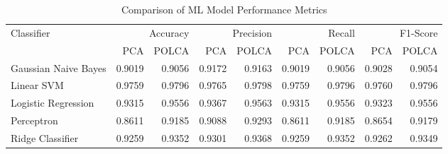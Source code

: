 \begin{table}[htbp]
\caption{Comparison of ML Model Performance Metrics}
\label{tab:model_comparison}
\begin{tabular}{lrrrrrrrr}
\toprule
Classifier & \multicolumn{2}{r}{Accuracy} & \multicolumn{2}{r}{Precision} & \multicolumn{2}{r}{Recall} & \multicolumn{2}{r}{F1-Score} \\
 & PCA & POLCA & PCA & POLCA & PCA & POLCA & PCA & POLCA \\
\midrule
Gaussian Naive Bayes & 0.9019 & 0.9056 & 0.9172 & 0.9163 & 0.9019 & 0.9056 & 0.9028 & 0.9054 \\
Linear SVM & 0.9759 & 0.9796 & 0.9765 & 0.9798 & 0.9759 & 0.9796 & 0.9760 & 0.9796 \\
Logistic Regression & 0.9315 & 0.9556 & 0.9367 & 0.9563 & 0.9315 & 0.9556 & 0.9323 & 0.9556 \\
Perceptron & 0.8611 & 0.9185 & 0.9088 & 0.9293 & 0.8611 & 0.9185 & 0.8654 & 0.9179 \\
Ridge Classifier & 0.9259 & 0.9352 & 0.9301 & 0.9368 & 0.9259 & 0.9352 & 0.9262 & 0.9349 \\
\bottomrule
\end{tabular}
\end{table}
